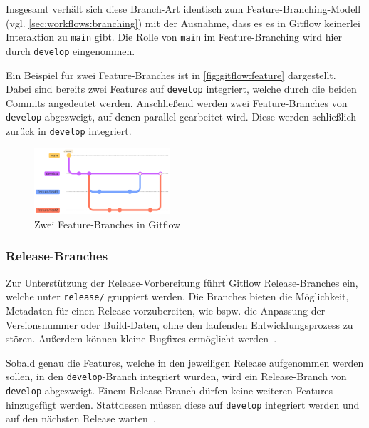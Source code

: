 Insgesamt verhält sich diese Branch\hyp Art identisch zum Feature\hyp Branching\hyp Modell (vgl. \autoref{sec:workflows:branching}) mit der Ausnahme, dass es es in Gitflow keinerlei Interaktion zu \texttt{main} gibt. Die Rolle von \texttt{main} im Feature\hyp Branching wird hier durch \texttt{develop} eingenommen.

Ein Beispiel für zwei Feature\hyp Branches ist in \autoref{fig:gitflow:feature} dargestellt. Dabei sind bereits zwei Features auf \texttt{develop} integriert, welche durch die beiden Commits angedeutet werden. Anschließend werden zwei Feature\hyp Branches von \texttt{develop} abgezweigt, auf denen parallel gearbeitet wird. Diese werden schließlich zurück in \texttt{develop} integriert.

\begin{figure}
    \includegraphics[width=0.45\textwidth]{assets/diagrams/gitflow/feature.pdf}
    \caption{Zwei Feature-Branches in Gitflow}
    \label{fig:gitflow:feature}
\end{figure}


\subsubsection{Release-Branches}

Zur Unterstützung der Release\hyp Vorbereitung führt Gitflow Release\hyp Branches ein, welche unter \texttt{release/} gruppiert werden. Die Branches bieten die Möglichkeit, Metadaten für einen Release vorzubereiten, wie bspw. die Anpassung der Versionsnummer oder Build-Daten, ohne den laufenden Entwicklungsprozess zu stören. Außerdem können kleine Bugfixes ermöglicht werden~\cite{driessenSuccessfulGitBranching2010}.

Sobald genau die Features, welche in den jeweiligen Release aufgenommen werden sollen, in den \texttt{develop}-Branch integriert wurden, wird ein Release\hyp Branch von \texttt{develop} abgezweigt. Einem Release\hyp Branch dürfen keine weiteren Features hinzugefügt werden. Stattdessen müssen diese auf \texttt{develop} integriert werden und auf den nächsten Release warten~\cite{driessenSuccessfulGitBranching2010}.


